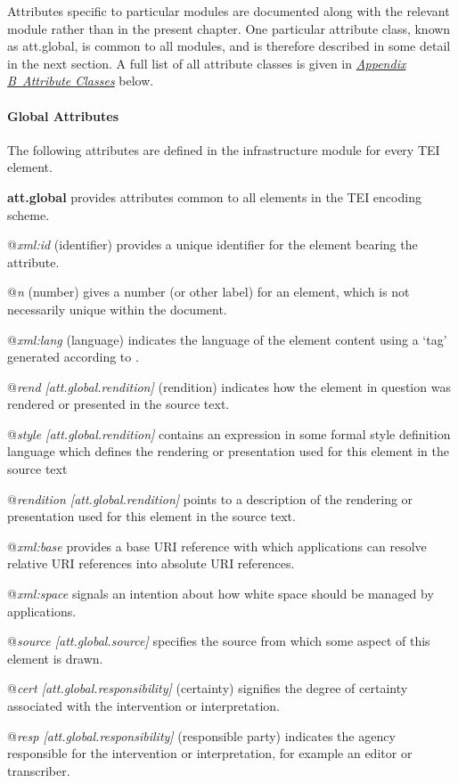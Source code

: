 Attributes specific to particular modules are documented along with the relevant module rather than in the present chapter. One particular attribute class, known as \textsf{att.global}, is common to all modules, and is therefore described in some detail in the next section. A full list of all attribute classes is given in \textit{\hyperref[REF-CLASSES-ATTS]{Appendix B\ Attribute Classes}} below.
\paragraph[{Global Attributes}]{Global Attributes}\label{STGA}\par
The following attributes are defined in the infrastructure module for every TEI element. 
\begin{sansreflist}
  
\item [\textbf{att.global}] provides attributes common to all elements in the TEI encoding scheme.\hfil\\[-10pt]\begin{sansreflist}
    \item[@{\itshape xml:id}]
  (identifier) provides a unique identifier for the element bearing the attribute.
    \item[@{\itshape n}]
  (number) gives a number (or other label) for an element, which is not necessarily unique within the document.
    \item[@{\itshape xml:lang}]
  (language) indicates the language of the element content using a ‘tag’ generated according to .
    \item[@{\itshape rend [att.global.rendition]}]
  (rendition) indicates how the element in question was rendered or presented in the source text.
    \item[@{\itshape style [att.global.rendition]}]
  contains an expression in some formal style definition language which defines the rendering or presentation used for this element in the source text
    \item[@{\itshape rendition [att.global.rendition]}]
  points to a description of the rendering or presentation used for this element in the source text.
    \item[@{\itshape xml:base}]
  provides a base URI reference with which applications can resolve relative URI references into absolute URI references.
    \item[@{\itshape xml:space}]
  signals an intention about how white space should be managed by applications.
    \item[@{\itshape source [att.global.source]}]
  specifies the source from which some aspect of this element is drawn.
    \item[@{\itshape cert [att.global.responsibility]}]
  (certainty) signifies the degree of certainty associated with the intervention or interpretation.
    \item[@{\itshape resp [att.global.responsibility]}]
  (responsible party) indicates the agency responsible for the intervention or interpretation, for example an editor or transcriber.
\end{sansreflist}  
\end{sansreflist}
